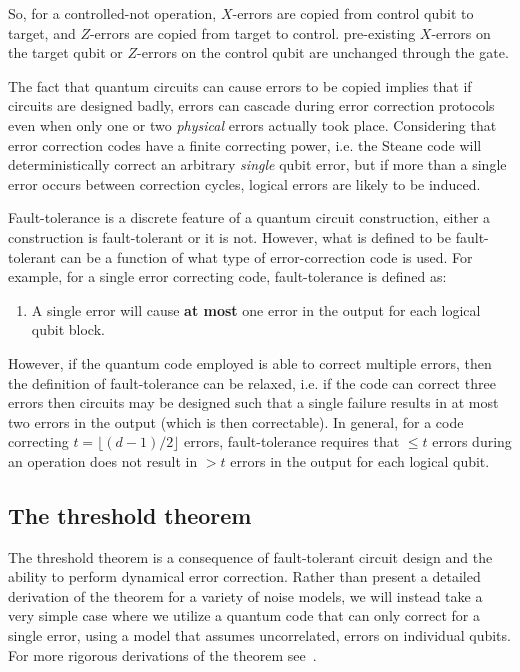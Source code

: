 So, for a controlled-not operation, $X$-errors are copied from control qubit to target, and $Z$-errors are copied from target to control.  pre-existing $X$-errors on the target qubit or $Z$-errors on the control qubit are unchanged through the gate.  

The fact that quantum circuits can cause errors to be copied implies that if circuits are designed badly, errors can cascade during error correction protocols even when only one or two {\it physical} errors actually took place.  Considering that error correction codes have a finite correcting power, i.e. the Steane code will deterministically correct an arbitrary {\it single} qubit error, but if more than a single error occurs between correction cycles, logical errors are likely to be induced.  

Fault-tolerance is a discrete feature of a quantum circuit construction, either a construction is fault-tolerant or it is not. However, what is defined to be fault-tolerant can be a function of what type of error-correction code is used.  For example, for a single error correcting code, fault-tolerance is defined as:
\begin{enumerate}
\item A single error will cause \textbf{at most} one error in the output for each logical qubit block.
\end{enumerate}
However, if the quantum code employed is able to correct multiple errors, then the definition of fault-tolerance can be relaxed, i.e. if the code can correct three errors then circuits may be designed such that a single failure results in at most two errors in the output (which is then correctable).  In general, for a code correcting $t=\lfloor (d-1)/2 \rfloor$ errors, fault-tolerance requires that $\leq t$ errors during an operation does not result in $> t$ errors in the output for each logical qubit.    
 
\subsection{The threshold theorem}
The threshold theorem is a consequence 
of fault-tolerant circuit design and the ability to perform dynamical error correction.  
Rather than present a detailed derivation of the theorem for a variety of noise models, we will 
instead take a very simple case where we utilize a quantum code that can only correct for a 
single error, using a model that assumes uncorrelated, errors on individual qubits.  For 
more rigorous derivations of the theorem see~\cite{bib:AB97,bib:G97+,bib:A07}.  

